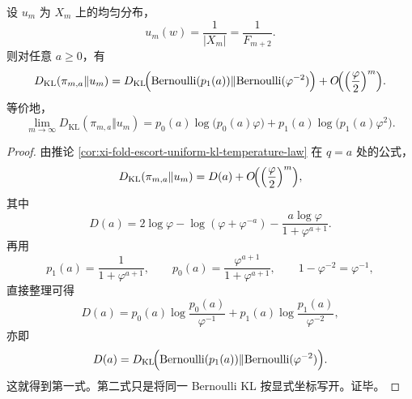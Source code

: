 \begin{theorem}\label{thm:xi-time-part54ab-escort-uniform-kl-bernoulli-reduction}
设 \(u_m\) 为 \(X_m\) 上的均匀分布，
\[
u_m(w)=\frac{1}{|X_m|}=\frac{1}{F_{m+2}}.
\]
则对任意 \(a\ge 0\)，有
\[
D_{\mathrm{KL}}(\pi_{m,a}\Vert u_m)
=
D_{\mathrm{KL}}\!\Bigl(\mathrm{Bernoulli}(p_1(a))\Vert \mathrm{Bernoulli}(\varphi^{-2})\Bigr)
+O\!\Bigl(\Bigl(\frac{\varphi}{2}\Bigr)^m\Bigr).
\]
等价地，
\[
\lim_{m\to\infty}D_{\mathrm{KL}}(\pi_{m,a}\Vert u_m)
=
p_0(a)\log\!\bigl(p_0(a)\varphi\bigr)
+
p_1(a)\log\!\bigl(p_1(a)\varphi^2\bigr).
\]
\end{theorem}
\begin{proof}
由推论 \ref{cor:xi-fold-escort-uniform-kl-temperature-law} 在 \(q=a\) 处的公式，
\[
D_{\mathrm{KL}}(\pi_{m,a}\Vert u_m)
=
D(a)+O\!\Bigl(\Bigl(\frac{\varphi}{2}\Bigr)^m\Bigr),
\]
其中
\[
D(a)=
2\log\varphi-\log(\varphi+\varphi^{-a})
-\frac{a\log\varphi}{1+\varphi^{a+1}}.
\]
再用
\[
p_1(a)=\frac{1}{1+\varphi^{a+1}},
\qquad
p_0(a)=\frac{\varphi^{a+1}}{1+\varphi^{a+1}},
\qquad
1-\varphi^{-2}=\varphi^{-1},
\]
直接整理可得
\[
D(a)
=
p_0(a)\log\!\frac{p_0(a)}{\varphi^{-1}}
+
p_1(a)\log\!\frac{p_1(a)}{\varphi^{-2}},
\]
亦即
\[
D(a)=
D_{\mathrm{KL}}\!\Bigl(\mathrm{Bernoulli}(p_1(a))\Vert \mathrm{Bernoulli}(\varphi^{-2})\Bigr).
\]
这就得到第一式。第二式只是将同一 Bernoulli KL 按显式坐标写开。证毕。
\end{proof}

